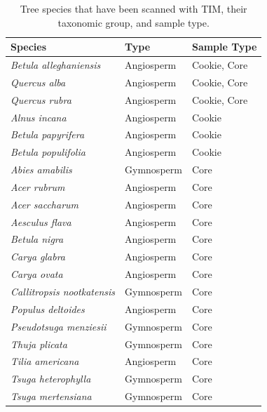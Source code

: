 \begin{table}[htbp]
    \centering
    \begin{tabular}{ |p{6.0cm}||p{3.0cm}|p{3.0cm}| }
        \hline
        \hline
        Species & Type & Sample Type \\
        \hline
        \textit{Betula alleghaniensis} & Angiosperm & Cookie, Core \\
        \textit{Quercus alba} & Angiosperm & Cookie, Core \\
        \textit{Quercus rubra} & Angiosperm & Cookie, Core \\
        \textit{Alnus incana} & Angiosperm & Cookie \\
        \textit{Betula papyrifera} & Angiosperm & Cookie \\
        \textit{Betula populifolia} & Angiosperm & Cookie \\
        \textit{Abies amabilis} & Gymnosperm & Core \\
        \textit{Acer rubrum} & Angiosperm & Core \\
        \textit{Acer saccharum} & Angiosperm & Core \\
        \textit{Aesculus flava} & Angiosperm & Core \\
        \textit{Betula nigra} & Angiosperm & Core \\
        \textit{Carya glabra} & Angiosperm & Core \\
        \textit{Carya ovata} & Angiosperm & Core \\
        \textit{Callitropsis nootkatensis} & Gymnosperm & Core \\
        \textit{Populus deltoides} & Angiosperm & Core \\
        \textit{Pseudotsuga menziesii} & Gymnosperm & Core \\
        \textit{Thuja plicata} & Gymnosperm & Core \\
        \textit{Tilia americana} & Angiosperm & Core \\
        \textit{Tsuga heterophylla} & Gymnosperm & Core \\
        \textit{Tsuga mertensiana} & Gymnosperm & Core \\
        \hline
    \end{tabular}
    \caption{Tree species that have been scanned with TIM, their taxonomic group, and sample type.}
    \label{tab:species}
\end{table}